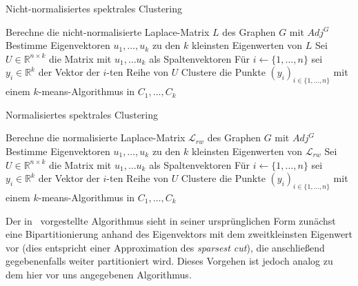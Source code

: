 \begin{algorithm}
\label{algo:non-normalized-spectral-clustering}
\caption{Nicht-normalisiertes spektrales Clustering~\cite{Luxburg07}}
	\DontPrintSemicolon
	
	\BlankLine
	
	Berechne die nicht-normalisierte Laplace-Matrix $L$ des Graphen $G$ mit $Adj^G$\;
	Bestimme Eigenvektoren $u_1, \dots, u_k$ zu den $k$ kleinsten Eigenwerten von $L$\;
	Sei $U \in \mathbb{R}^{n \times k}$ die Matrix mit $u_1, \dots u_k$ als Spaltenvektoren\;
	Für $i \leftarrow \{ 1, \dots, n \}$ sei $y_i \in \mathbb{R}^k$ der Vektor der $i$-ten Reihe von $U$\;
	Clustere die Punkte $(y_i)_{i \in \{1, \dots, n\}}$ mit einem $k$-means-Algorithmus in $C_1, \dots, C_k$
\end{algorithm}

\begin{algorithm}
\label{algo:normalized-spectral-clustering-shi-malik}
\caption{Normalisiertes spektrales Clustering~\cite{ShiM00}}
	\DontPrintSemicolon
	
	\BlankLine
	
	Berechne die normalisierte Laplace-Matrix $\mathcal{L}_{rw}$ des Graphen $G$ mit $Adj^G$\;
	Bestimme Eigenvektoren $u_1, \dots, u_k$ zu den $k$ kleinsten Eigenwerten von $\mathcal{L}_{rw}$\;
	Sei $U \in \mathbb{R}^{n \times k}$ die Matrix mit $u_1, \dots u_k$ als Spaltenvektoren\;
	Für $i \leftarrow \{ 1, \dots, n \}$ sei $y_i \in \mathbb{R}^k$ der Vektor der $i$-ten Reihe von $U$\;
	Clustere die Punkte $(y_i)_{i \in \{1, \dots, n\}}$ mit einem $k$-means-Algorithmus in $C_1, \dots, C_k$
\end{algorithm}
Der in~\cite{ShiM00} vorgestellte Algorithmus sieht in seiner ursprünglichen Form zunächst eine Bipartitionierung anhand des
Eigenvektors mit dem zweitkleinsten Eigenwert vor (dies entspricht einer Approximation des \emph{sparsest cut}),
die anschließend gegebenenfalls weiter partitioniert wird. Dieses Vorgehen ist jedoch analog zu dem hier vor uns angegebenen
Algorithmus.

